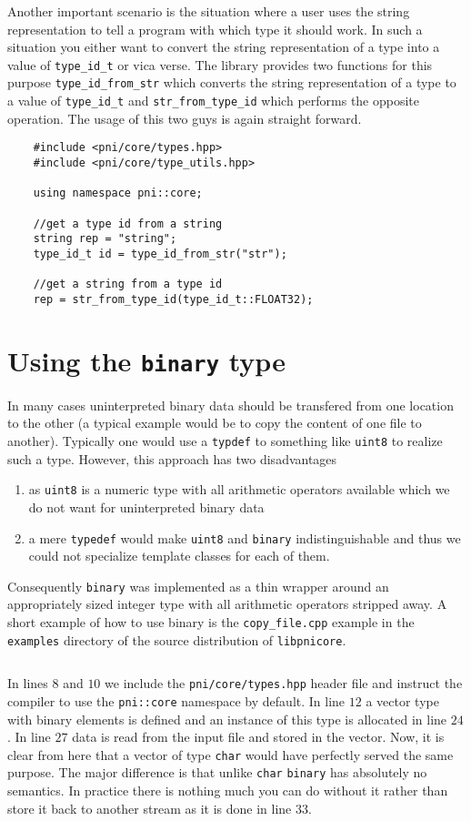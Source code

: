 Another important scenario is the situation where a user uses the string
representation to tell a program with which type it should work. 
In such a situation you either want to convert the string representation of a
type into a value of {\tt type\_id\_t} or vica verse. The library provides two
functions for this purpose {\tt type\_id\_from\_str} which converts the string
representation of a type to a value of {\tt type\_id\_t} and 
{\tt str\_from\_type\_id} which performs the opposite operation. 
The usage of this two guys is again straight forward.
\begin{verbatim}
    #include <pni/core/types.hpp>
    #include <pni/core/type_utils.hpp>

    using namespace pni::core;

    //get a type id from a string
    string rep = "string";
    type_id_t id = type_id_from_str("str");

    //get a string from a type id
    rep = str_from_type_id(type_id_t::FLOAT32);
\end{verbatim}


\section{Using the {\tt binary} type}\label{section:using_binary}

In many cases uninterpreted binary data should be transfered from one location
to the other (a typical example would be to copy the content of one file to
another).
Typically one would use a {\tt typdef} to something like {\tt uint8} to realize
such a type. However, this approach has two disadvantages
\begin{enumerate}
\item as {\tt uint8} is a numeric type with all arithmetic operators available
which we do not want for uninterpreted binary data 
\item a mere {\tt typedef} would make {\tt uint8} and {\tt binary} 
indistinguishable and thus we could not specialize template classes for each of
them.
\end{enumerate}
Consequently {\tt binary} was implemented as a thin wrapper around an
appropriately sized integer type with all arithmetic operators stripped away.
A short example of how to use binary is the {\tt copy\_file.cpp} example in the
{\tt examples} directory of the source distribution of {\tt libpnicore}. 

\inputminted[linenos,firstline=24,frame=lines]{cpp}{../examples/copy_file.cpp}

In lines $8$ and $10$ we include the {\tt pni/core/types.hpp} header file and
instruct the compiler to use the {\tt pni::core} namespace by default. In line
$12$ a vector type with binary elements is defined and an instance of this type
is allocated in line $24$. 
In line $27$ data is read from the input file and stored in the vector. Now, it
is clear from here that a vector of type  {\tt char} would have perfectly served
the same purpose. The major difference is that unlike {\tt char} {\tt binary}
has absolutely no semantics. In practice there is nothing much you can do
without it rather than store it back to another stream as it is done in 
line $33$.
